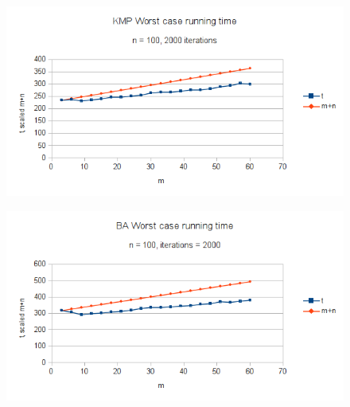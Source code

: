 \documentclass[a4paper,10pt]{article}
\begin{document}
\begin{figure}[h]
  \centering
  \includegraphics[scale=0.75]{./images/eval_kmp.png}
  \label{fig:eval1}
\end{figure}

\begin{figure}[h]
  \centering
  \includegraphics[scale=0.75]{./images/eval_ba-1.png}
  \label{fig:eval2}
\end{figure}
\end{document}
